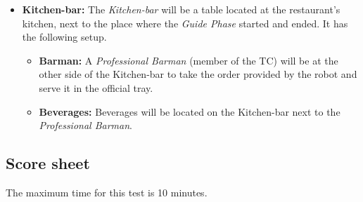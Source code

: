 \begin{itemize}
	\item \textbf{Kitchen-bar:} The \textit{Kitchen-bar} will be a table located at the restaurant's kitchen, next to the place where the \textit{Guide Phase} started and ended. It has the following setup.
	\begin{itemize}
		\item \textbf{Barman:} A \textit{Professional Barman} (member of the TC) will be at the other side of the Kitchen-bar to take the order provided by the robot and serve it in the official tray.
		\item \textbf{Beverages:} Beverages will be located on the Kitchen-bar next to the \textit{Professional Barman}.
	\end{itemize}

\end{itemize}





\subsection{Score sheet}
The maximum time for this test is 10 minutes.

